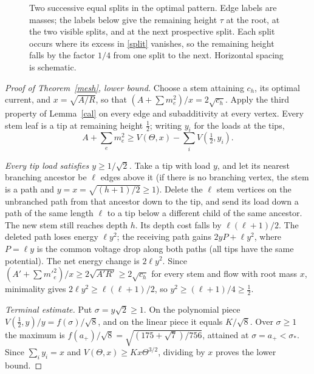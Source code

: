\documentclass[11pt,a4paper]{article}
\theoremstyle{remark}
\begin{document}
\begin{figure}[tb]
\centering
{}
\caption{Two successive equal splits in the optimal pattern. Edge labels are masses; the labels below give the remaining height $\tau$ at the root, at the two visible splits, and at the next prospective split. Each split occurs where its excess in \eqref{split} vanishes, so the remaining height falls by the factor $1/4$ from one split to the next. Horizontal spacing is schematic.}\label{fig:dyadic}
\end{figure}

\begin{proof}[Proof of Theorem~\ref{mesh}, lower bound]
Choose a stem attaining $c_h$, its optimal current, and $x=\sqrt{A/R}$, so that $(A+\sum m_e^2)/x=2\sqrt{c_h}$. Apply the third property of Lemma~\ref{cal} on every edge and subadditivity at every vertex. Every stem leaf is a tip at remaining height $\frac12$; writing $y_i$ for the loads at the tips,
\[
 A+\sum_e m_e^2\ge V(\Theta,x)-\sum_i V(\tfrac12,y_i).
\]

\emph{Every tip load satisfies $y\ge1/\sqrt2$.} Take a tip with load $y$, and let its nearest branching ancestor be $\ell$ edges above it (if there is no branching vertex, the stem is a path and $y=x=\sqrt{(h+1)/2}\ge1$). Delete the $\ell$ stem vertices on the unbranched path from that ancestor down to the tip, and send its load down a path of the same length $\ell$ to a tip below a different child of the same ancestor. The new stem still reaches depth $h$. Its depth cost falls by $\ell(\ell+1)/2$. The deleted path loses energy $\ell y^2$; the receiving path gains $2yP+\ell y^2$, where $P=\ell y$ is the common voltage drop along both paths (all tips have the same potential). The net energy change is $2\ell y^2$. Since $(A'+\sum m'^2_e)/x\ge2\sqrt{A'R'}\ge2\sqrt{c_h}$ for every stem and flow with root mass $x$, minimality gives $2\ell y^2\ge\ell(\ell+1)/2$, so $y^2\ge(\ell+1)/4\ge\frac12$.

\emph{Terminal estimate.} Put $\sigma=y\sqrt2\ge1$. On the polynomial piece $V(\frac12,y)/y=f(\sigma)/\sqrt8$, and on the linear piece it equals $K/\sqrt8$. Over $\sigma\ge1$ the maximum is $f(a_+)/\sqrt8=\sqrt{(175+\sqrt7)/756}$, attained at $\sigma=a_+<\sigma_*$. Since $\sum_iy_i=x$ and $V(\Theta,x)\ge Kx\Theta^{3/2}$, dividing by $x$ proves the lower bound.
\end{proof}
\end{document}
